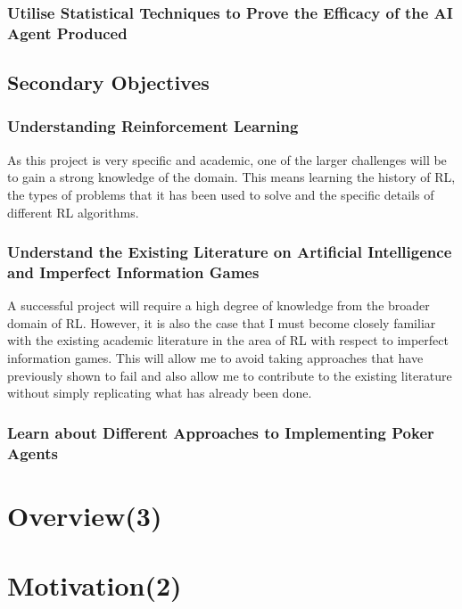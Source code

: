 \subsubsection{Utilise Statistical Techniques to Prove the Efficacy of the AI Agent Produced}


\subsection{Secondary Objectives}
\subsubsection{Understanding Reinforcement Learning}
As this project is very specific and academic, one of the larger challenges will be to gain a strong knowledge of the domain. This means learning the history of RL, the types of problems that it has been used to solve and the specific details of different RL algorithms. 

\subsubsection{Understand the Existing Literature on Artificial Intelligence and Imperfect Information Games}
A successful project will require a high degree of knowledge from the broader domain of RL. However, it is also the case that I must become closely familiar with the existing academic literature in the area of RL with respect to imperfect information games. This will allow me to avoid taking approaches that have previously shown to fail and also allow me to contribute to the existing literature without simply replicating what has already been done.

\subsubsection{Learn about Different Approaches to Implementing Poker Agents}


\section{Overview(3)}

\section{Motivation(2)}


